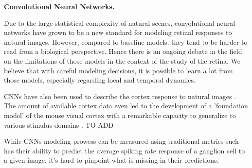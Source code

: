 \textbf{Convolutional Neural Networks.}

Due to the large statistical complexity of natural scenes, convolutional neural
networks have grown to be a new standard for modeling retinal responses to
natural images. However, compared to baseline models, they tend to be harder to
read from a biological perspective. Hence there is an ongoing debate in the
field on the limitations of those models in the context of the study of the
retina. We believe that with careful modeling decisions, it is possible to
learn a lot from those models, especially regarding local and temporal
dynamics.

CNNs have also been used to describe the cortex response to natural images
\cite{cadena_deep_2019}. The amount of available cortex data even led to the
development of a 'foundation model' of the mouse visual cortex with a
remarkable capacity to generalize to various stimulus domains \cite{wang}. TO
ADD

While CNNs modeling prowess can be measured using traditional metrics such has
their ability to predict the average spiking rate response of a ganglion cell
to a given image, it's hard to pinpoint what is missing in their predictions.